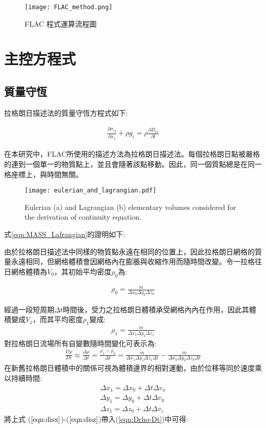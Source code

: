 \begin{figure*}[ht!]
    \centering
    \texttt{[image: FLAC\_method.png]}
    \caption{FLAC 程式運算流程圖
    }
    \label{fig::FLAC_method}
\end{figure*}

\section{主控方程式}

\subsection{質量守恆}

拉格朗日描述法的質量守恆方程式如下:

\begin{align}
\frac{\partial \sigma_{ij}}{\partial x_j}+\rho g_i = \rho \frac{\partial D_{vi}}{\partial t} 
\label{eqn:MASS_Lagrangian}
\end{align}

在本研究中，FLAC所使用的描述方法為拉格朗日描述法。每個拉格朗日點被嚴格的連到一個單一的物質點上，並且會隨著該點移動。因此，同一個質點總是在同一格座標上，與時間無關。

\begin{figure*}[ht!]
    \centering
    \texttt{[image: eulerian\_and\_lagrangian.pdf]}
    \caption{ Eulerian (a) and Lagrangian (b) elementary volumes considered for the derivation of continuity equation. }
    \label{fig::Lagrangian Volume}
\end{figure*}

式\ref{eqn:MASS_Lafrangian}的證明如下:

由於拉格朗日描述法中同樣的物質點永遠在相同的位置上，因此拉格朗日網格的質量永遠相同，但網格體積會因網格內在膨脹與收縮作用而隨時間改變。令一拉格往日網格體積為$V_0$，其初始平均密度$\rho_0$為:

\begin{align}
\rho_0 = \frac{m}{\Delta x_0 \Delta y_0 \Delta z_0}
\end{align}

經過一段短周期$\Delta t$時間後，受力之拉格朗日體積承受網格內內在作用，因此其體積變成$V_1$，而其平均密度$\rho_1$變成:
\begin{align}
\rho_1 = \frac{m}{\Delta x_1 \Delta y_1 \Delta z_1}
\end{align}
對拉格朗日流場所有自變數隨時間變化可表示為:
\begin{align}
\frac{D\rho}{Dt} \approx \frac{\Delta \rho}{\Delta t} = \frac{\rho_1-\rho_0}{\Delta t}=\frac{m}{\Delta x_1 \Delta y_1 \Delta z_1\Delta t}-\frac{m}{\Delta x_0 \Delta y_0 \Delta z_0\Delta t}\label{eqn:Drho-Dt}
\end{align}
在新舊拉格朗日體積中的關係可視為體積邊界的相對運動，由於位移等同於速度乘以持續時間:
\begin{align}
\Delta x_1 = \Delta x_0+\Delta t\Delta v_x\label{eqn:disx}\\ 
\Delta y_1 = \Delta y_0+\Delta t\Delta v_y\label{eqn:disy}\\
\Delta z_1 = \Delta z_0+\Delta t\Delta v_z\label{eqn:disz}
\end{align}
將上式 ($\ref{eqn:disx}$)-($\ref{eqn:disz}$)帶入(\ref{eqn:Drho-Dt})中可得:

